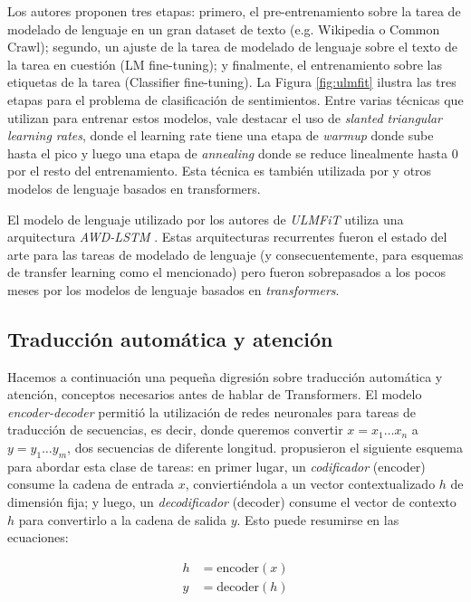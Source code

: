 Los autores proponen tres etapas: primero, el pre-entrenamiento sobre la tarea de modelado de lenguaje en un gran dataset de texto (e.g. Wikipedia o Common Crawl); segundo, un ajuste de la tarea de modelado de lenguaje sobre el texto de la tarea en cuestión (LM fine-tuning); y finalmente, el entrenamiento sobre las etiquetas de la tarea (Classifier fine-tuning). La Figura \ref{fig:ulmfit} ilustra las tres etapas para el problema de clasificación de sentimientos. Entre varias técnicas que utilizan para entrenar estos modelos, vale destacar el uso de \emph{slanted triangular learning rates}, donde el learning rate tiene una etapa de \emph{warmup} donde sube hasta el pico y luego una etapa de \emph{annealing} donde se reduce linealmente hasta 0 por el resto del entrenamiento. Esta técnica es también utilizada por \bert{} y otros modelos de lenguaje basados en transformers.

El modelo de lenguaje utilizado por los autores de \emph{ULMFiT} utiliza una arquitectura \emph{AWD-LSTM} \cite{merity2018regularizing}. Estas arquitecturas recurrentes fueron el estado del arte para las tareas de modelado de lenguaje (y consecuentemente, para esquemas de transfer learning como el mencionado) pero fueron sobrepasados a los pocos meses por los modelos de lenguaje basados en \emph{transformers}.


\subsection{Traducción automática y atención}
\label{sec:02_transformers}


Hacemos a continuación una pequeña digresión sobre traducción automática y atención, conceptos necesarios antes de hablar de Transformers. El modelo \emph{encoder-decoder} permitió la utilización de redes neuronales para tareas de traducción de secuencias, es decir, donde queremos convertir $x = x_1 \ldots x_n$ a $y = y_1 \ldots y_m$, dos secuencias de diferente longitud. \citet{sutskever2014sequence} propusieron el siguiente esquema para abordar esta clase de tareas: en primer lugar, un \emph{codificador} (encoder) consume la cadena de entrada $x$,  conviertiéndola a un vector contextualizado $h$ de dimensión fija; y luego, un \emph{decodificador} (decoder) consume el vector de contexto $h$ para convertirlo a la cadena de salida $y$. Esto puede resumirse en las ecuaciones:

\begin{align*}
    h   &= \text{encoder}(x) \\
    y   &= \text{decoder}(h)
\end{align*}

